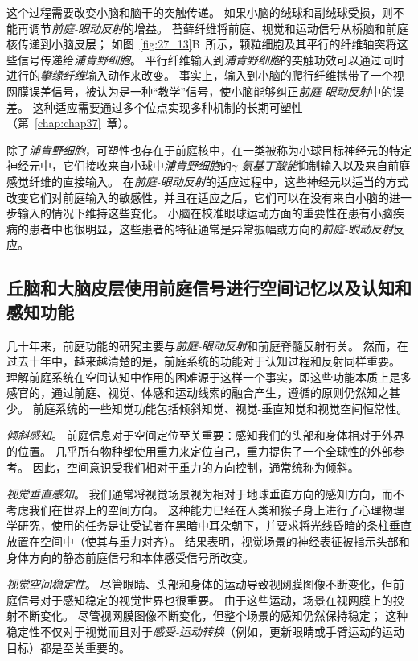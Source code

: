 这个过程需要改变小脑和脑干的突触传递。
如果小脑的绒球和副绒球受损，则不能再调节\textit{前庭-眼动反射}的增益。
苔藓纤维将前庭、视觉和运动信号从桥脑和前庭核传递到小脑皮层；
如图~\ref{fig:27_13}B~所示，颗粒细胞及其平行的纤维轴突将这些信号传递给\textit{浦肯野细胞}。
平行纤维输入到\textit{浦肯野细胞}的突触功效可以通过同时进行的\textit{攀缘纤维}输入动作来改变。
事实上，输入到小脑的爬行纤维携带了一个视网膜误差信号，被认为是一种“教学”信号，使小脑能够纠正\textit{前庭-眼动反射}中的误差。
这种适应需要通过多个位点实现多种机制的长期可塑性（第~\ref{chap:chap37}~章）。


除了\textit{浦肯野细胞}，可塑性也存在于前庭核中，在一类被称为小球目标神经元的特定神经元中，它们接收来自小球中\textit{浦肯野细胞}的\textit{$\gamma$-氨基丁酸能}抑制输入以及来自前庭感觉纤维的直接输入。
在\textit{前庭-眼动反射}的适应过程中，这些神经元以适当的方式改变它们对前庭输入的敏感性，并且在适应之后，它们可以在没有来自小脑的进一步输入的情况下维持这些变化。
小脑在校准眼球运动方面的重要性在患有小脑疾病的患者中也很明显，这些患者的特征通常是异常振幅或方向的\textit{前庭-眼动反射}反应。



\subsection{丘脑和大脑皮层使用前庭信号进行空间记忆以及认知和感知功能}

几十年来，前庭功能的研究主要与\textit{前庭-眼动反射}和前庭脊髓反射有关。
然而，在过去十年中，越来越清楚的是，前庭系统的功能对于认知过程和反射同样重要。
理解前庭系统在空间认知中作用的困难源于这样一个事实，即这些功能本质上是多感官的，通过前庭、视觉、体感和运动线索的融合产生，遵循的原则仍然知之甚少。
前庭系统的一些知觉功能包括倾斜知觉、视觉-垂直知觉和视觉空间恒常性。


\textit{倾斜感知}。
前庭信息对于空间定位至关重要：感知我们的头部和身体相对于外界的位置。
几乎所有物种都使用重力来定位自己，重力提供了一个全球性的外部参考。
因此，空间意识受我们相对于重力的方向控制，通常统称为倾斜。


\textit{视觉垂直感知}。
我们通常将视觉场景视为相对于地球垂直方向的感知方向，而不考虑我们在世界上的空间方向。
这种能力已经在人类和猴子身上进行了心理物理学研究，使用的任务是让受试者在黑暗中耳朵朝下，并要求将光线昏暗的条柱垂直放置在空间中（使其与重力对齐）。
结果表明，视觉场景的神经表征被指示头部和身体方向的静态前庭信号和本体感受信号所改变。


\textit{视觉空间稳定性}。
尽管眼睛、头部和身体的运动导致视网膜图像不断变化，但前庭信号对于感知稳定的视觉世界也很重要。
由于这些运动，场景在视网膜上的投射不断变化。
尽管视网膜图像不断变化，但整个场景的感知仍然保持稳定；
这种稳定性不仅对于视觉而且对于\textit{感受-运动转换}（例如，更新眼睛或手臂运动的运动目标）都是至关重要的。



